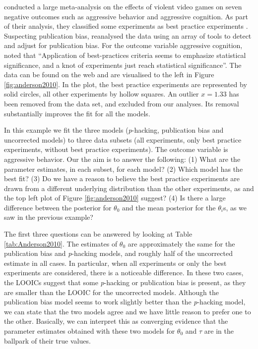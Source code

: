 \documentclass[useAMS,usenatbib,referee]{biom}
\begin{document}
\citet{anderson2010violent} conducted a large meta-analysis on the effects of violent video games on seven negative outcomes such as aggressive behavior and aggressive cognition. As part of their analysis, they classified some experiments as best practice experiments \citep[for more details, see Table 2 of][]{anderson2010violent}. Suspecting publication bias, \citet{hilgard2017overstated} reanalysed the data using an array of tools to detect and adjust for publication bias. For the outcome variable aggressive cognition, \citet{hilgard2017overstated} noted that \enquote{Application of best-practices criteria seems to emphasize statistical significance, and a knot of experiments just reach statistical significance}. The data can be found on the web \citep{Hilgard2017} and are visualised to the left in Figure \ref{fig:anderson2010}. In the plot, the best practice experiments are represented by solid circles, all other experiments by hollow squares. An outlier $x=1.33$ has been removed from the data set, and excluded from our analyses. Its removal substantially improves the fit for all the models. 

In this example we fit the three models (\textit{p}-hacking, publication bias and uncorrected models) to three data subsets (all experiments, only best practice experiments, without best practice experiments). The outcome variable is aggressive behavior. Our the aim is to answer the following: (1) What are the parameter estimates, in each subset, for each model? (2) Which model has the best fit? (3) Do we have a reason to believe the best practice experiments are drawn from a different underlying distribution than the other experiments, as \citet{hilgard2017overstated} and the top left plot of Figure \ref{fig:anderson2010} suggest? (4) Is there a large difference between the posterior for $\theta_{0}$ and the mean posterior for the $\theta_{i}$s, as we saw in the previous example?



The first three questions can be answered by looking at Table \ref{tab:Anderson2010}. The estimates of $\theta_{0}$ are approximately the same for the publication bias and \textit{p}-hacking models, and roughly half of the uncorrected estimate in all cases. In particular, when all experiments or only the best experiments are considered, there is a noticeable difference. In these two cases, the LOOICs suggest that some \textit{p}-hacking or publication bias is present, as they are smaller than the LOOIC for the uncorrected models. Although the publication bias model seems to work slightly better than the \textit{p}-hacking model, we can state that the two models agree and we have little reason to prefer one to the other. Basically, we can interpret this as converging evidence that the parameter estimates obtained with these two models for $\theta_{0}$ and $\tau$ are in the ballpark of their true values.
\end{document}

